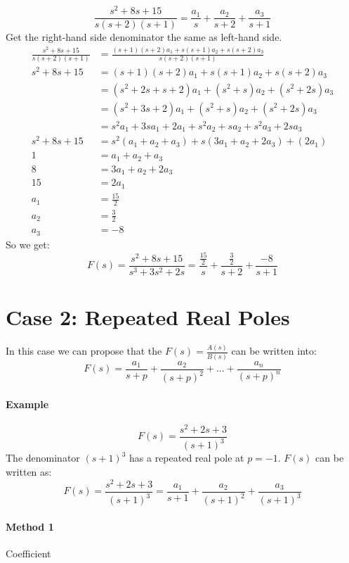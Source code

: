 \[
\frac{s^2+8s+15}{s(s+2)(s+1)} = \frac{a_1}{s} + \frac{a_2}{s+2} + \frac{a_3}{s+1} 
\]
Get the right-hand side denominator the same as left-hand side.
\[
\begin{split}
	\frac{s^2+8s+15}{s(s+2)(s+1)} &= \frac{(s+1)(s+2)a_1+s(s+1)a_2+s(s+2)a_3}{s(s+2)(s+1)} \\
	s^2+8s+15 &= (s+1)(s+2)a_1+s(s+1)a_2+s(s+2)a_3 \\
	&= (s^2+2s+s+2)a_1 + (s^2+s)a_2 + (s^2+2s)a_3 \\
	&= (s^2+3s+2)a_1 + (s^2+s)a_2 + (s^2+2s)a_3 \\
	&= s^2a_1+3sa_1+2a_1 + s^2a_2+sa_2 + s^2a_3+2sa_3 \\
	s^2+8s+15 &= s^2(a_1+a_2+a_3) + s(3a_1+a_2+2a_3) + (2a_1)\\
	1 &= a_1+a_2+a_3 \\
	8 &= 3a_1+a_2+2a_3 \\
	15 &= 2a_1 \\
	a_1 &= \frac{15}{2} \\
	a_2 &= \frac{3}{2} \\
	a_3 &= -8
\end{split}
\]
So we get:
\[
\boxed{F(s) = \frac{s^2+8s+15}{s^3+3s^2+2s} = \frac{\frac{15}{2}}{s} + \frac{\frac{3}{2}}{s+2} + \frac{-8}{s+1}}
\]

\section{Case 2: Repeated Real Poles}
\begin{tcolorbox}[title=Method]
	In this case we can propose that the \(F(s) = \frac{A(s)}{B(s)}\) can be written into:
	\[
	F(s) = \frac{a_1}{s+p} + \frac{a_2}{(s+p)^2} + ... + \frac{a_n}{(s+p)^n}
	\]
\end{tcolorbox}

\paragraph{Example}
\[
F(s) = \frac{s^2+2s+3}{(s+1)^3}
\]
The denominator \((s+1)^3\) has a repeated real pole at \(p=-1\). \(F(s)\) can be written as:
\[
F(s) = \frac{s^2+2s+3}{(s+1)^3} = \frac{a_1}{s+1} + \frac{a_2}{(s+1)^2} + \frac{a_3}{(s+1)^3}
\]

\paragraph{Method 1} Coefficient


